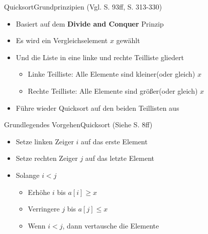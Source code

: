 \begin{frame}{Quicksort}{Grundprinzipien (Vgl. \cite{ottmann2017} S. 93ff, \cite{wayne2014} S. 313-330)}
    \begin{itemize}
        \item Basiert auf dem \textbf{Divide and Conquer} Prinzip
        \item Es wird ein Vergleichselement $x$ gewählt
        \item Und die Liste in eine linke und rechte Teilliste gliedert
        \begin{itemize}
            \item Linke Teilliste: Alle Elemente sind kleiner(oder gleich) $x$
            \item Rechte Teilliste: Alle Elemente sind größer(oder gleich) $x$
        \end{itemize}
        \item Führe wieder Quicksort auf den beiden Teillisten aus
    \end{itemize}
\end{frame}

\begin{frame}{Grundlegendes Vorgehen}{Quicksort (Siehe \cite{fahr:algo} S. 8ff)}
    \begin{itemize}
        \item Setze linken Zeiger $i$ auf das erste Element
        \item Setze rechten Zeiger $j$ auf das letzte Element
        \item Solange $i<j$
        \begin{itemize}
            \item Erhöhe $i$ bis $a[i]\ge x$
            \item Verringere $j$ bis $a[j]\le x$
            \item Wenn $i<j$, dann vertausche die Elemente
        \end{itemize}
    \end{itemize}
\end{frame}